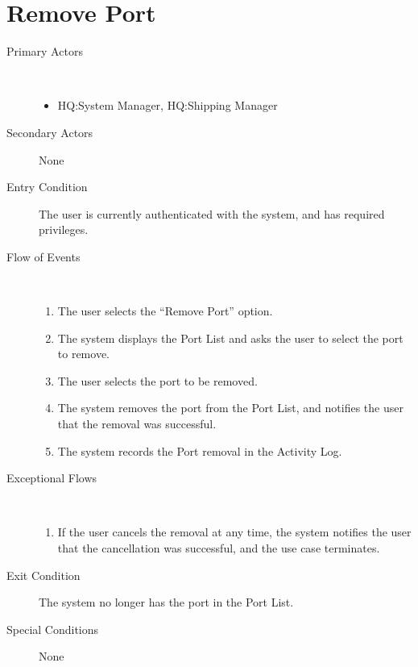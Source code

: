 \documentclass[a4paper,10pt]{report}
\begin{document}
\section{Remove Port}
\begin{description}
\item[Primary Actors] \
  \begin{itemize}
  \item HQ:System Manager, HQ:Shipping Manager
  \end{itemize}
\item[Secondary Actors] None
\item[Entry Condition]
  The user is currently authenticated with the system, and has required privileges.
\item[Flow of Events] \
  \begin{enumerate}
  \item The user selects the ``Remove Port'' option.
  \item The system displays the Port List and asks the user to select the port to remove.
  \item The user selects the port to be removed.
  \item The system removes the port from the Port List, and notifies the user that the removal was successful.
    \item The system records the Port removal in the Activity Log.
  \end{enumerate}
\item[Exceptional Flows] \
  \begin{enumerate}
  \item If the user cancels the removal at any time, the system notifies the user that the cancellation was successful, and the use case terminates.
  \end{enumerate}
\item[Exit Condition]
  The system no longer has the port in the Port List.
\item[Special Conditions] None
\end{description}
\end{document}
